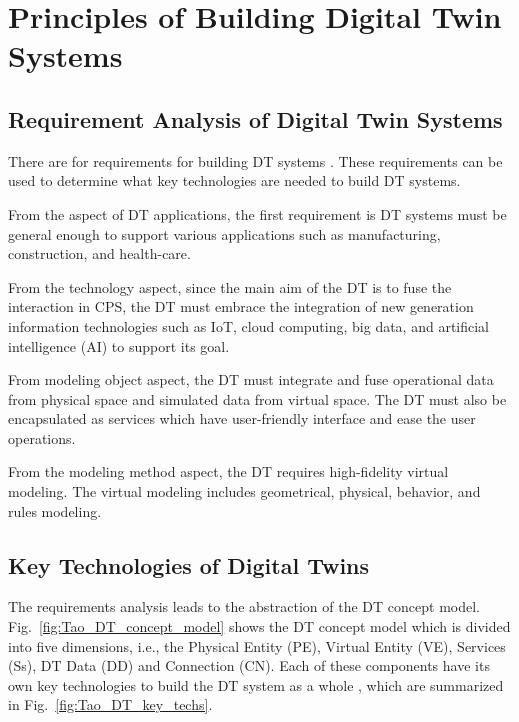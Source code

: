 \documentclass[article,table]{aaltoseries}
\begin{document}

\section{Principles of Building Digital Twin Systems}
\subsection{Requirement Analysis of Digital Twin Systems}
There are for requirements for building DT systems \cite{Tao2019}. These requirements can be used to determine what key technologies are needed to build DT systems.

From the aspect of DT applications, the first requirement is DT systems must be general enough to support various applications such as manufacturing, construction, and health-care.

From the technology aspect, since the main aim of the DT is to fuse the interaction in CPS, the DT must embrace the integration of new generation information technologies such as IoT, cloud computing, big data, and artificial intelligence (AI) to support its goal.

From modeling object aspect, the DT must integrate and fuse operational data from physical space and simulated data from virtual space. The DT must also be encapsulated as services which have user-friendly interface and ease the user operations.

From the modeling method aspect, the DT requires high-fidelity virtual modeling. The virtual modeling includes geometrical, physical, behavior, and rules modeling.

\subsection{Key Technologies of Digital Twins}
The requirements analysis leads to the abstraction of the DT concept model. Fig.~\ref{fig:Tao_DT_concept_model} shows the DT concept model which is divided into five dimensions, i.e., the Physical Entity (PE), Virtual Entity (VE), Services (Ss), DT Data (DD) and Connection (CN). Each of these components have its own key technologies to build the DT system as a whole \cite{Tao2019}, which are summarized in Fig.~\ref{fig:Tao_DT_key_techs}.
\end{document}
